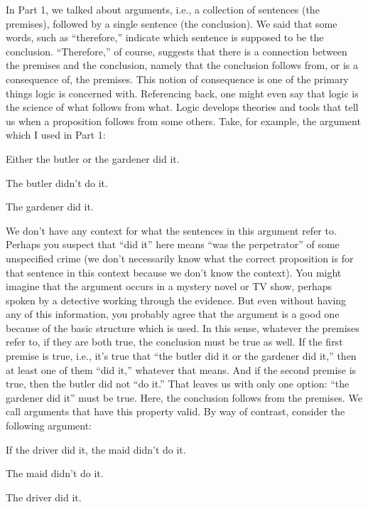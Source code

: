 In Part 1, we talked about arguments, i.e., a collection of sentences (the premises), followed by a single sentence (the conclusion). We said that some words, such as “therefore,” indicate which sentence is supposed to be the conclusion. “Therefore,” of course, suggests that there is a connection between the premises and the conclusion, namely that the conclusion follows from, or is a consequence of, the premises. This notion of consequence is one of the primary things logic is concerned with. Referencing back, one might even say that logic is the science of what follows from what. Logic develops theories and tools that tell us when a proposition follows from some others. Take, for example, the argument which I used in Part 1:
\begin{earg}
	\item[] Either the butler or the gardener did it.
	\item[] The butler didn't do it.
	\item[\therefore] The gardener did it.
\end{earg}
We don’t have any context for what the sentences in this argument refer to. Perhaps you suspect that “did it” here means “was the perpetrator” of some unspecified crime (we don't necessarily know what the correct proposition is for that sentence in this context because we don't know the context). You might imagine that the argument occurs in a mystery novel or TV show, perhaps spoken by a detective working through the evidence. But even without having any of this information, you probably agree that the argument is a good one because of the basic structure which is used. In this sense, whatever the premises refer to, if they are both true, the conclusion must be true as well. If the first premise is true, i.e., it’s true that “the butler did it or the gardener did it,” then at least one of them “did it,” whatever that means. And if the second premise is true, then the butler did not “do it.” That leaves us with only one option: “the gardener did it” must be true. Here, the conclusion follows from the premises. We call arguments that have this property \gls{valid}.
By way of contrast, consider the following argument:
\begin{earg}\label{argMaidDriver}
	\item[] If the driver did it, the maid didn't do it.
	\item[] The maid didn't do it.
	\item[\therefore] The driver did it.
\end{earg}
